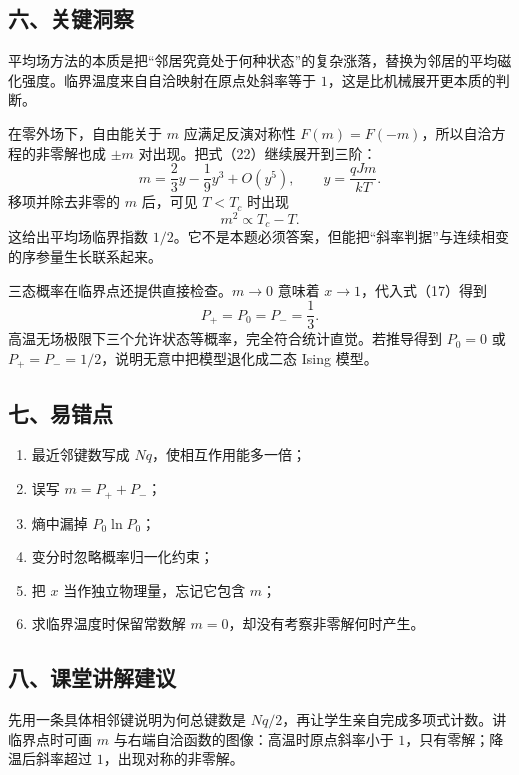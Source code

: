 \documentclass[12pt,a4paper,UTF8]{ctexart}
\newcommand{\tightlist}{\setlength{\itemsep}{0pt}\setlength{\parskip}{0pt}}
\begin{document}
\subsection{六、关键洞察}\label{ux516dux5173ux952eux6d1eux5bdf-5}

平均场方法的本质是把``邻居究竟处于何种状态''的复杂涨落，替换为邻居的平均磁化强度。临界温度来自自洽映射在原点处斜率等于
\(1\)，这是比机械展开更本质的判断。

在零外场下，自由能关于 \(m\) 应满足反演对称性
\(F(m)=F(-m)\)，所以自洽方程的非零解也成 \(\pm m\)
对出现。把式（22）继续展开到三阶： \[
m=\frac23y-\frac19y^3+O(y^5),
\qquad y=\frac{qJm}{kT}.
\] 移项并除去非零的 \(m\) 后，可见 \(T<T_c\) 时出现 \[
m^2\propto T_c-T.
\] 这给出平均场临界指数
\(1/2\)。它不是本题必须答案，但能把``斜率判据''与连续相变的序参量生长联系起来。

三态概率在临界点还提供直接检查。\(m\to0\) 意味着
\(x\to1\)，代入式（17）得到 \[
P_+=P_0=P_-=\frac13.
\] 高温无场极限下三个允许状态等概率，完全符合统计直觉。若推导得到
\(P_0=0\) 或 \(P_+=P_-=1/2\)，说明无意中把模型退化成二态 Ising 模型。

\subsection{七、易错点}\label{ux4e03ux6613ux9519ux70b9-5}

\begin{enumerate}
\def\labelenumi{\arabic{enumi}.}
\tightlist
\item
  最近邻键数写成 \(Nq\)，使相互作用能多一倍；
\item
  误写 \(m=P_++P_-\)；
\item
  熵中漏掉 \(P_0\ln P_0\)；
\item
  变分时忽略概率归一化约束；
\item
  把 \(x\) 当作独立物理量，忘记它包含 \(m\)；
\item
  求临界温度时保留常数解 \(m=0\)，却没有考察非零解何时产生。
\end{enumerate}

\subsection{八、课堂讲解建议}\label{ux516bux8bfeux5802ux8bb2ux89e3ux5efaux8bae-5}

先用一条具体相邻键说明为何总键数是
\(Nq/2\)，再让学生亲自完成多项式计数。讲临界点时可画 \(m\)
与右端自洽函数的图像：高温时原点斜率小于 \(1\)，只有零解；降温后斜率超过
\(1\)，出现对称的非零解。
\end{document}
